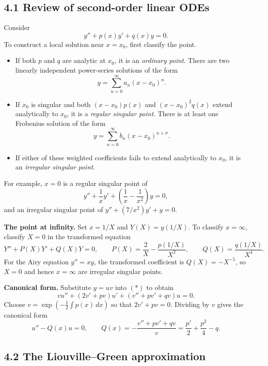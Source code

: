 \documentclass[11pt,a4paper]{article}
\begin{document}
\subsection*{4.1 Review of second-order linear ODEs}

Consider
\begin{equation}
    y''+p(x)y'+q(x)y=0.
    \tag{$*$}
\end{equation}
To construct a local solution near $x=x_0$, first classify the point.
\begin{itemize}
    \item If both $p$ and $q$ are analytic at $x_0$, it is an
    \emph{ordinary point}. There are two linearly independent power-series
    solutions of the form
    \[
        y=\sum_{n=0}^{\infty}a_n(x-x_0)^n.
    \]
    \item If $x_0$ is singular and both $(x-x_0)p(x)$ and $(x-x_0)^2q(x)$
    extend analytically to $x_0$, it is a \emph{regular singular point}.
    There is at least one Frobenius solution of the form
    \[
        y=\sum_{n=0}^{\infty}b_n(x-x_0)^{n+\sigma}.
    \]
    \item If either of these weighted coefficients fails to extend
    analytically to $x_0$, it is an \emph{irregular singular point}.
\end{itemize}

\noindent For example, $x=0$ is a regular singular point of
\[
    y''+\frac1x y'+\left(\frac1x-\frac1{x^2}\right)y=0,
\]
and an irregular singular point of $y''+(7/x^2)y'+y=0$.

\medskip
\noindent\textbf{The point at infinity.}
Set $x=1/X$ and $Y(X)=y(1/X)$. To classify $x=\infty$, classify $X=0$
in the transformed equation
\[
    Y''+P(X)Y'+Q(X)Y=0,\qquad
    P(X)=\frac{2}{X}-\frac{p(1/X)}{X^2},\qquad
    Q(X)=\frac{q(1/X)}{X^4}.
\]
For the Airy equation $y''=xy$, the transformed coefficient is
$Q(X)=-X^{-5}$, so $X=0$ and hence $x=\infty$ are irregular singular points.

\medskip
\noindent\textbf{Canonical form.}
Substitute $y=uv$ into $(*)$ to obtain
\[
    vu''+(2v'+pv)u'+(v''+pv'+qv)u=0.
\]
Choose $v=\exp(-\tfrac12\int p(x)\,dx)$ so that $2v'+pv=0$.
Dividing by $v$ gives the canonical form
\[
    u''-Q(x)u=0,\qquad
    Q(x)=-\frac{v''+pv'+qv}{v}
        =\frac{p'}2+\frac{p^2}{4}-q.
\]

\subsection*{4.2 The Liouville--Green approximation}
\end{document}
